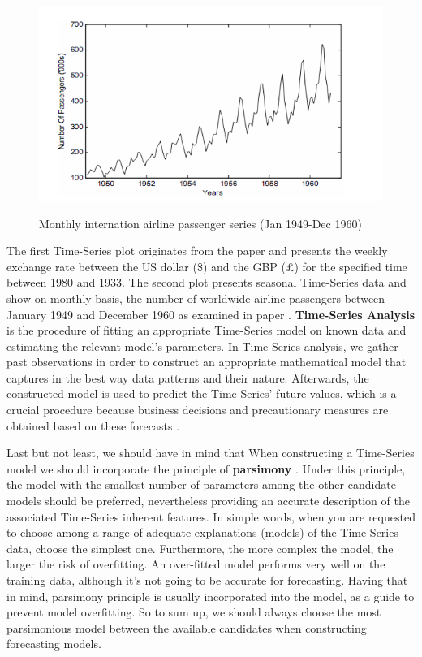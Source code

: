 \begin{figure}[htbp]
\centering
\includegraphics[width=0.8\linewidth]{project/fd1.PNG}
\label{fig:felix}
\caption{Monthly internation airline passenger series (Jan 1949-Dec 1960)}
\end{figure} The first Time-Series plot originates from the paper \cite{zhang2003time} and presents the weekly exchange rate between the US dollar (\$) and the GBP (\pounds) for the specified time between 1980 and 1933. The second plot presents seasonal Time-Series data and show on monthly basis, the number of worldwide airline passengers between January 1949 and December 1960 as examined in paper \cite{adhikari2013introductory}.
\textbf{Time-Series Analysis} is the procedure of fitting an appropriate Time-Series model on known data and estimating the relevant model's parameters. In Time-Series analysis, we gather past observations in order to construct an appropriate mathematical model that captures in the best way data patterns and their nature. Afterwards, the constructed model is used to predict the Time-Series' future values, which is a crucial procedure because business decisions and precautionary measures are obtained based on these forecasts .
\par Last but not least, we should have in mind that When constructing a Time-Series model we should incorporate the principle of \textbf{parsimony} \cite{provost2013data}. 
Under this principle, the model with the smallest number of parameters among the other candidate models should be preferred, nevertheless providing an accurate description of the associated Time-Series inherent features. In simple words, when you are requested to choose among a range of adequate explanations (models) of the Time-Series data, choose the simplest one. Furthermore, the more complex the model, the larger the risk of overfitting.
An over-fitted model performs very well on the training data, although it's not going to be accurate for forecasting. Having that in mind, parsimony principle is usually incorporated into the model, as a guide to prevent model overfitting. So to sum up, we should always choose the most parsimonious model between the available candidates when constructing forecasting models.

